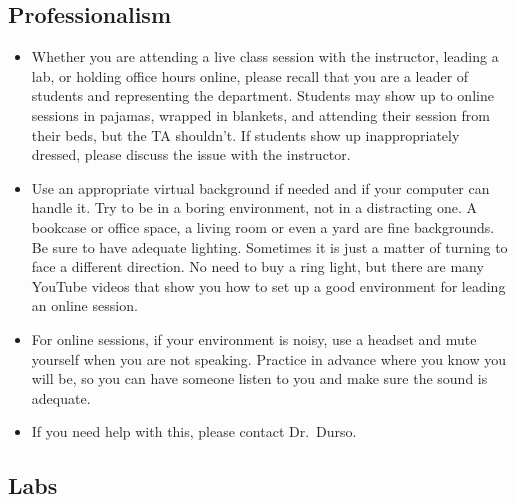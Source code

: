 \documentclass[
]{article}
\begin{document}
\hypertarget{professionalism}{%
\subsection{Professionalism}\label{professionalism}}

\begin{itemize}
\item
  Whether you are attending a live class session with the instructor, leading a lab, or holding office hours online, please recall that you are a leader of students and representing the department. Students may show up to online sessions in pajamas, wrapped in blankets, and attending their session from their beds, but the TA shouldn't. If students show up inappropriately dressed, please discuss the issue with the instructor.
\item
  Use an appropriate virtual background if needed and if your computer can handle it. Try to be in a boring environment, not in a distracting one. A bookcase or office space, a living room or even a yard are fine backgrounds. Be sure to have adequate lighting. Sometimes it is just a matter of turning to face a different direction. No need to buy a ring light, but there are many YouTube videos that show you how to set up a good environment for leading an online session.
\item
  For online sessions, if your environment is noisy, use a headset and mute yourself when you are not speaking. Practice in advance where you know you will be, so you can have someone listen to you and make sure the sound is adequate.
\item
  If you need help with this, please contact Dr.~Durso.
\end{itemize}

\hypertarget{labs}{%
\subsection{Labs}\label{labs}}
\end{document}
